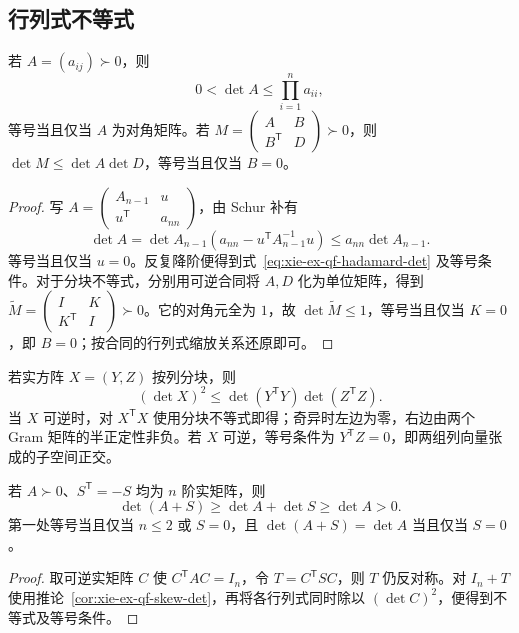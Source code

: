 \subsection{行列式不等式}

\begin{proposition}
\label{prop:xie-ex-qf-hadamard-det}
若 $A=(a_{ij})\succ0$，则
\begin{equation}
 0<\det A\le\prod_{i=1}^n a_{ii},
 \label{eq:xie-ex-qf-hadamard-det}
\end{equation}
等号当且仅当 $A$ 为对角矩阵。若 $M=\begin{pmatrix}A&B\\B^{\mathsf T}&D\end{pmatrix}\succ0$，则 $\det M\le\det A\det D$，等号当且仅当 $B=0$。
\end{proposition}
\begin{proof}
写 $A=\begin{pmatrix}A_{n-1}&u\\u^{\mathsf T}&a_{nn}\end{pmatrix}$，由 Schur 补有
\[
 \det A=\det A_{n-1}(a_{nn}-u^{\mathsf T}A_{n-1}^{-1}u)
 \le a_{nn}\det A_{n-1}.
\]
等号当且仅当 $u=0$。反复降阶便得到式~\eqref{eq:xie-ex-qf-hadamard-det} 及等号条件。对于分块不等式，分别用可逆合同将 $A,D$ 化为单位矩阵，得到 $\widetilde M=\begin{pmatrix}I&K\\K^{\mathsf T}&I\end{pmatrix}\succ0$。它的对角元全为 $1$，故 $\det\widetilde M\le1$，等号当且仅当 $K=0$，即 $B=0$；按合同的行列式缩放关系还原即可。
\end{proof}

若实方阵 $X=(Y,Z)$ 按列分块，则
\[
 (\det X)^2\le\det(Y^{\mathsf T}Y)\det(Z^{\mathsf T}Z).
\]
当 $X$ 可逆时，对 $X^{\mathsf T}X$ 使用分块不等式即得；奇异时左边为零，右边由两个 Gram 矩阵的半正定性非负。若 $X$ 可逆，等号条件为 $Y^{\mathsf T}Z=0$，即两组列向量张成的子空间正交。

\begin{proposition}
\label{prop:xie-ex-qf-positive-skew-det}
若 $A\succ0$、$S^{\mathsf T}=-S$ 均为 $n$ 阶实矩阵，则
\[
 \det(A+S)\ge\det A+\det S\ge\det A>0.
\]
第一处等号当且仅当 $n\le2$ 或 $S=0$，且 $\det(A+S)=\det A$ 当且仅当 $S=0$。
\end{proposition}
\begin{proof}
取可逆实矩阵 $C$ 使 $C^{\mathsf T}AC=I_n$，令 $T=C^{\mathsf T}SC$，则 $T$ 仍反对称。对 $I_n+T$ 使用推论~\ref{cor:xie-ex-qf-skew-det}，再将各行列式同时除以 $(\det C)^2$，便得到不等式及等号条件。
\end{proof}

